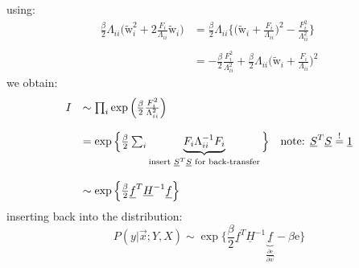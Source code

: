 using: 
\begin{equation}
	\begin{array}{ll}
	\frac{\beta}{2} \Lambda_{ii} \Big( \tilde{\mathrm{w}}_i^2 
		+ 2 \frac{F_i}{\Lambda_{ii}} \tilde{\mathrm{w}}_i
		\Big)
	& = \frac{\beta}{2} \Lambda_{ii} \Bigg\{ \Big( \tilde{\mathrm{w}}_i 
		+ \frac{F_i}{\Lambda_{ii}} \Big)^2 
		- \frac{F_i^2}{\Lambda_{ii}^2}
		\Bigg\} \\\\
	& = - \frac{\beta}{2} \frac{F_i^2}{\Lambda_{ii}^2} 
		+ \frac{\beta}{2} \Lambda_{ii} \Big( \tilde{\mathrm{w}}_i 
		+ \frac{F_i}{\Lambda_{ii}} \Big)^2
	\end{array} 
\end{equation}
we obtain:
\begin{equation}
	\begin{array}{llr}
	I & \sim \prod_i \exp \Big( \frac{\beta}{2} \frac{F_i^2}{\Lambda_{ii}^2}
		\Big) &\\\\
	& = \exp \Big\{ \frac{\beta}{2} \sum_i 
		\underbrace{ F_i \Lambda_{ii}^{-1} F_i }_{\text{insert }
			\underline{S}^T \underline{S} \text{ for back-transfer}}
		\Big\} & \text{note: } \underline{S}^T \underline{S} 
			\stackrel{\mathrm{!}}{=} \underline{1} \\\\
	& \sim \exp \Big\{ \frac{\beta}{2} \underline{f}^T \underline{H}^{-1}
		\underline{f} \Big\} &
	\end{array}
\end{equation}
inserting back into the distribution:
\begin{equation}
	P(y|\vec{x};Y,X) 
		\sim \exp \Big\{ \frac{\beta}{2} 
		\underline{f}^T \underline{H}^{-1} 
		\underbrace{\underline{f}}_{ 
			\frac{\partial \mathrm{e}}{\partial 
				\vec{w}} }
		-\beta \mathrm{e}
		\Big\}
\end{equation}
